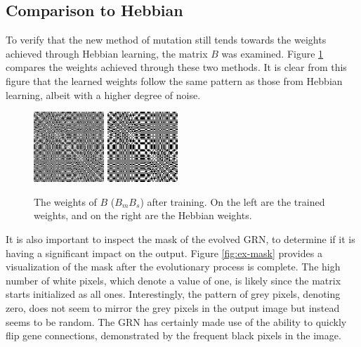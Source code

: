 \documentclass[twocolumn,a4paper,11pt]{article}
\begin{document}
    \subsection{Comparison to Hebbian}
    To verify that the new method of mutation still tends towards the weights achieved through Hebbian learning, the matrix $B$ was examined. Figure \ref{fig:ex-weights} compares the weights achieved through these two methods. It is clear from this figure that the learned weights follow the same pattern as those from Hebbian learning, albeit with a higher degree of noise.

    \begin{figure}[h]
        \centering
        \includegraphics[width=0.45\linewidth]{ex-img/masked_weights.png}
        \includegraphics[width=0.45\linewidth]{ex-img/hebb_weights.png}
        \caption{The weights of $B$ ($B_mB_s$) after training. On the left are the trained weights, and on the right are the Hebbian weights.} \label{fig:ex-weights}
    \end{figure}

    It is also important to inspect the mask of the evolved GRN, to determine if it is having a significant impact on the output. Figure \ref{fig:ex-mask} provides a visualization of the mask after the evolutionary process is complete. The high number of white pixels, which denote a value of one, is likely since the matrix starts initialized as all ones. Interestingly, the pattern of grey pixels, denoting zero, does not seem to mirror the grey pixels in the output image but instead seems to be random. The GRN has certainly made use of the ability to quickly flip gene connections, demonstrated by the frequent black pixels in the image.
\end{document}
